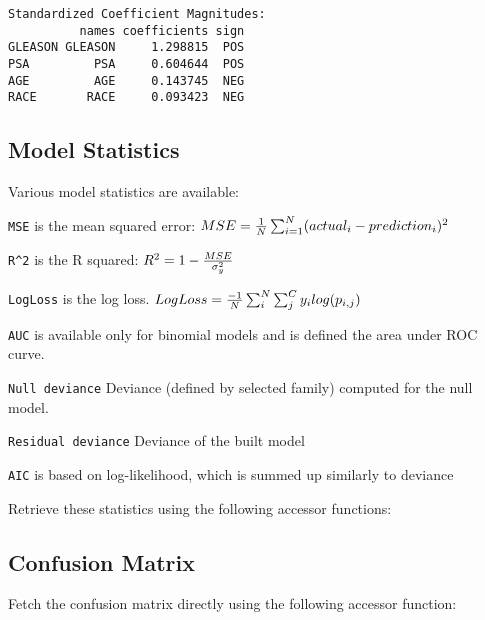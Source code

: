 

\begin{lstlisting}[style=output]
Standardized Coefficient Magnitudes:
          names coefficients sign
GLEASON GLEASON     1.298815  POS
PSA         PSA     0.604644  POS
AGE         AGE     0.143745  NEG
RACE       RACE     0.093423  NEG
\end{lstlisting}

\subsection{Model Statistics}

Various model statistics are available:

\texttt{MSE} is the mean squared error: $MSE = {1 \over N} \sum_{i=1}^N (actual_i - prediction_i)^2$

\texttt{R\textasciicircum2} is the R squared: $R^2 = 1 - {MSE \over \sigma_y^2}$

\texttt{LogLoss} is the log loss. $LogLoss = {-1 \over N} \sum_i^N \sum_j^C y_{i}log(p_{i,j})$

\texttt{AUC} is available only for binomial models and is defined the area under ROC curve.


\texttt{Null deviance} Deviance (defined by selected family) computed for the null model. 

\texttt{Residual deviance} Deviance of the built model

\texttt{AIC} is based on log-likelihood, which is summed up similarly to deviance

Retrieve these statistics using the following accessor functions:

\waterExampleInR


\waterExampleInPython


\subsection{Confusion Matrix}

Fetch the confusion matrix directly using the following accessor function:

\waterExampleInR



